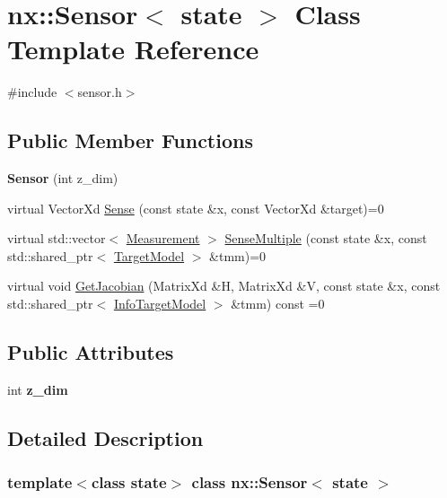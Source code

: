 \hypertarget{classnx_1_1Sensor}{}\section{nx\+:\+:Sensor$<$ state $>$ Class Template Reference}
\label{classnx_1_1Sensor}


{\ttfamily \#include $<$sensor.\+h$>$}

\subsection*{Public Member Functions}
\begin{DoxyCompactItemize}
\item 
\mbox{\label{classnx_1_1Sensor_a7f5218bff3e514d6539caabdbbb5e077}} 
{\bfseries Sensor} (int z\+\_\+dim)
\item 
virtual Vector\+Xd \hyperlink{classnx_1_1Sensor_a1dfc0088b798aa167c666f7e00587ab3}{Sense} (const state \&x, const Vector\+Xd \&target)=0
\item 
virtual std\+::vector$<$ \hyperlink{structnx_1_1Measurement}{Measurement} $>$ \hyperlink{classnx_1_1Sensor_a6c8d5300337277858d417f6279f851a7}{Sense\+Multiple} (const state \&x, const std\+::shared\+\_\+ptr$<$ \hyperlink{classnx_1_1TargetModel}{Target\+Model} $>$ \&tmm)=0
\item 
virtual void \hyperlink{classnx_1_1Sensor_aa9b370055e91f8913915d12d18450743}{Get\+Jacobian} (Matrix\+Xd \&H, Matrix\+Xd \&V, const state \&x, const std\+::shared\+\_\+ptr$<$ \hyperlink{classnx_1_1InfoTargetModel}{Info\+Target\+Model} $>$ \&tmm) const =0
\end{DoxyCompactItemize}
\subsection*{Public Attributes}
\begin{DoxyCompactItemize}
\item 
\mbox{\label{classnx_1_1Sensor_ac6a5a70ce332694a2c7a6b5aa1dcaf1d}} 
int {\bfseries z\+\_\+dim}
\end{DoxyCompactItemize}


\subsection{Detailed Description}
\subsubsection*{template$<$class state$>$\newline
class nx\+::\+Sensor$<$ state $>$}

